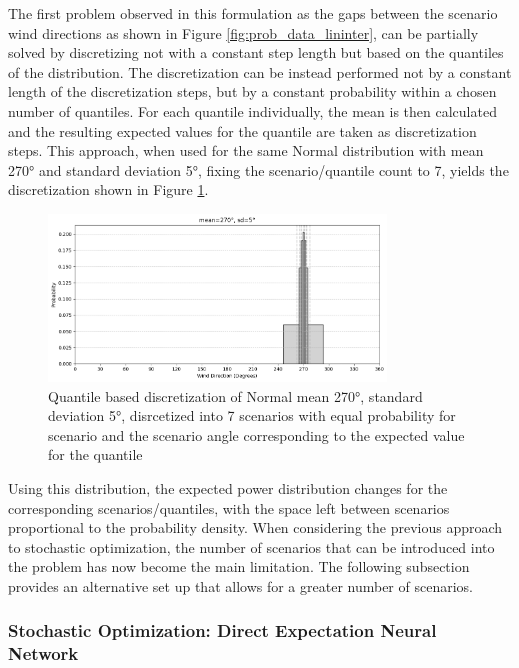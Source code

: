 \documentclass[preprint,12pt]{elsarticle}
\begin{document}
The first problem observed in this formulation as the gaps between the scenario wind directions as shown in Figure \ref{fig:prob_data_lininter}, can be partially solved by discretizing not with a constant step length but based on the quantiles of the distribution. The discretization can be instead performed not by a constant length of the discretization steps, but by a constant probability within a chosen number of quantiles. For each quantile individually, the mean is then calculated and the resulting expected values for the quantile are taken as discretization steps. This approach, when used for the same Normal distribution with mean 270° and standard deviation 5°, fixing the scenario/quantile count to 7, yields the discretization shown in Figure \ref{fig:wind_dist_opti_quantiles}. 

\begin{figure}[h] 
	\centering
	\includegraphics[width=0.8\textwidth]{../figures/optimization/wind_dist_opti_quantiles.png} 
	\caption{Quantile based discretization of Normal mean 270°,  standard deviation 5°, disrcetized into 7 scenarios with equal probability for scenario and the scenario angle corresponding to the expected value for the quantile }
	\label{fig:wind_dist_opti_quantiles}
\end{figure} 

Using this distribution, the expected power distribution changes for the corresponding scenarios/quantiles, with the space left between scenarios proportional to the probability density. When considering the previous approach to stochastic optimization, the number of scenarios that can be introduced into the problem has now become the main limitation. The following subsection provides an alternative set up that allows for a greater number of scenarios.

\subsubsection{Stochastic Optimization: Direct Expectation Neural Network}
\end{document}
